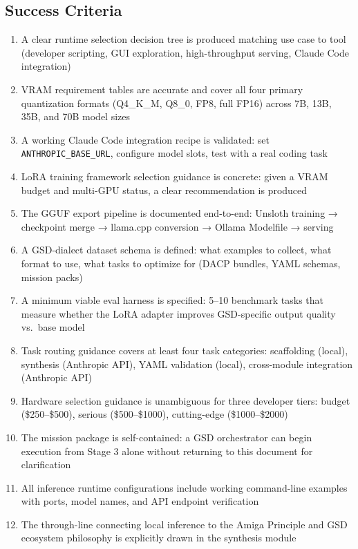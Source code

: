 \documentclass[11pt,letterpaper]{article}
\begin{document}
\subsection{Success Criteria}

\begin{enumerate}[leftmargin=*, label=\textbf{SC\arabic*.}]
  \item A clear runtime selection decision tree is produced matching use case to tool (developer scripting, GUI exploration, high-throughput serving, Claude Code integration)
  \item VRAM requirement tables are accurate and cover all four primary quantization formats (Q4\_K\_M, Q8\_0, FP8, full FP16) across 7B, 13B, 35B, and 70B model sizes
  \item A working Claude Code integration recipe is validated: set \texttt{ANTHROPIC\_BASE\_URL}, configure model slots, test with a real coding task
  \item LoRA training framework selection guidance is concrete: given a VRAM budget and multi-GPU status, a clear recommendation is produced
  \item The GGUF export pipeline is documented end-to-end: Unsloth training → checkpoint merge → llama.cpp conversion → Ollama Modelfile → serving
  \item A GSD-dialect dataset schema is defined: what examples to collect, what format to use, what tasks to optimize for (DACP bundles, YAML schemas, mission packs)
  \item A minimum viable eval harness is specified: 5--10 benchmark tasks that measure whether the LoRA adapter improves GSD-specific output quality vs.\ base model
  \item Task routing guidance covers at least four task categories: scaffolding (local), synthesis (Anthropic API), YAML validation (local), cross-module integration (Anthropic API)
  \item Hardware selection guidance is unambiguous for three developer tiers: budget (\$250--\$500), serious (\$500--\$1000), cutting-edge (\$1000--\$2000)
  \item The mission package is self-contained: a GSD orchestrator can begin execution from Stage 3 alone without returning to this document for clarification
  \item All inference runtime configurations include working command-line examples with ports, model names, and API endpoint verification
  \item The through-line connecting local inference to the Amiga Principle and GSD ecosystem philosophy is explicitly drawn in the synthesis module
\end{enumerate}
\end{document}

